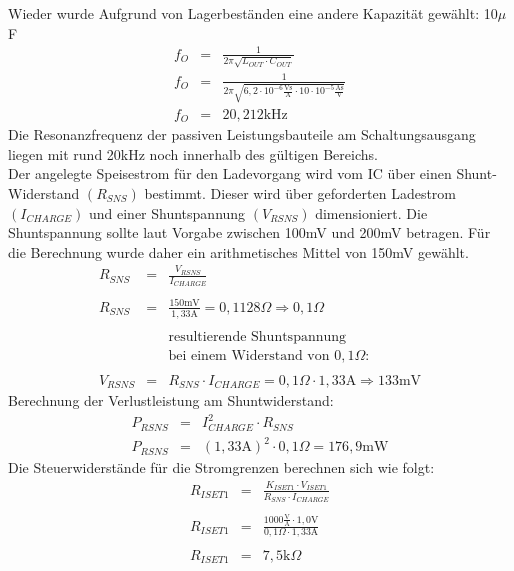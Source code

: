 \documentclass[12pt]{scrreprt} %
\begin{document}
Wieder wurde Aufgrund von Lagerbeständen eine andere Kapazität gewählt: 10$\mu$F 
\begin{eqnarray}
f_O&=&\frac{1}{2 \pi \sqrt{L_{OUT} \cdot C_{OUT}}}\\
f_O&=&\frac{1}{2 \pi \sqrt{6,2 \cdot 10^{-6} \frac{\text{Vs}}{\text{A}} \cdot 10 \cdot 10^{-5} \frac{\text{As}}{\text{V}}}}\\
f_O&=& 20,212\text{kHz}
\end{eqnarray}
Die Resonanzfrequenz der passiven Leistungsbauteile am Schaltungsausgang liegen mit rund 20kHz noch innerhalb des gültigen Bereichs.\\
Der angelegte Speisestrom für den Ladevorgang wird vom IC über einen Shunt-Widerstand $\left( R_{SNS} \right)$ bestimmt. Dieser wird über geforderten Ladestrom $\left( I_{CHARGE} \right)$ und einer Shuntspannung $\left( V_{RSNS} \right)$ dimensioniert. Die Shuntspannung sollte laut Vorgabe zwischen 100mV und 200mV betragen. Für die Berechnung wurde daher ein arithmetisches Mittel von 150mV gewählt.
\begin{eqnarray}
R_{SNS}&=&\frac{V_{RSNS}}{I_{CHARGE}}\\
\nonumber\\
R_{SNS}&=&\frac{150\text{mV}}{1,33\text{A}} = 0,1128 \Omega \Rightarrow 0,1 \Omega \\
\nonumber\\
&&\textrm{resultierende Shuntspannung} \nonumber \\
&&\textrm{bei einem Widerstand von } 0,1 \Omega : \nonumber \\
\nonumber\\
V_{RSNS}&=&R_{SNS} \cdot I_{CHARGE} = 0,1 \Omega \cdot 1,33\text{A} \Rightarrow 133\text{mV}
\end{eqnarray}
Berechnung der Verlustleistung am Shuntwiderstand:
\begin{eqnarray}
P_{RSNS}&=& I_{CHARGE}^2 \cdot R_{SNS}\\
P_{RSNS}&=& \left( 1,33\text{A} \right)^2 \cdot 0,1 \Omega = 176,9\text{mW}
\end{eqnarray}
Die Steuerwiderstände für die Stromgrenzen berechnen sich wie folgt:
\begin{eqnarray}
R_{ISET1}&=&\frac{K_{ISET1} \cdot V_{ISET1}}{R_{SNS} \cdot I_{CHARGE}}\\
 \nonumber \\
R_{ISET1}&=&\frac{1000 \frac{\text{V}}{\text{A}} \cdot 1,0\text{V}}{0,1\Omega \cdot 1,33\text{A}}\\
 \nonumber \\
R_{ISET1}&=&7,5\text{k}\Omega
\end{eqnarray}
\end{document}
